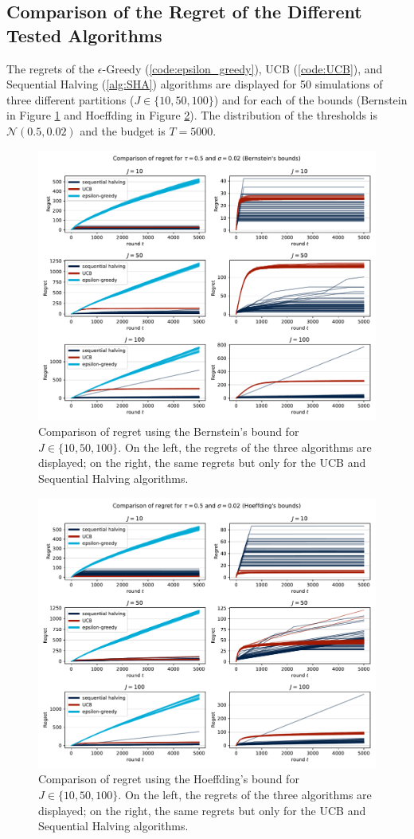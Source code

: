 \documentclass{statsmsc}
\begin{document}
\subsection{Comparison of the Regret of the Different Tested Algorithms}


The regrets of the $\epsilon$-Greedy (\ref{code:epsilon_greedy}), UCB (\ref{code:UCB}), and Sequential Halving (\ref{alg:SHA}) algorithms are displayed for 50 simulations of three different partitions ($J \in \{10, 50, 100\}$) and for each of the bounds (Bernstein in Figure \ref{fig:regret_bern} and Hoeffding in Figure \ref{fig:regret_hoeff}). The distribution of the thresholds is 
$\mathcal{N}(0.5, 0.02)$ and the budget is $T = 5000$.

\begin{figure}[htbp]
  \centering
  \includegraphics[width=0.8 \textwidth]{images/regret.pdf}
  \caption{Comparison of regret using the Bernstein's bound for $J \in \{10, 50, 100\}$. On the left, the regrets of the three algorithms are displayed; on the right, the same regrets but only for the UCB and Sequential Halving algorithms.}
  \label{fig:regret_bern}
\end{figure}

\begin{figure}[htbp]
  \centering
  \includegraphics[width=0.8 \textwidth]{images/regret_hoeffding.pdf}
  \caption{Comparison of regret using the Hoeffding's bound for $J \in \{10, 50, 100\}$. On the left, the regrets of the three algorithms are displayed; on the right, the same regrets but only for the UCB and Sequential Halving algorithms.}
  \label{fig:regret_hoeff}
\end{figure}
\end{document}
